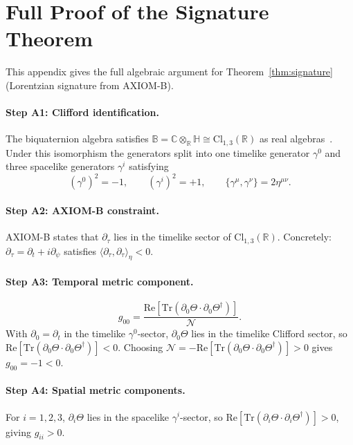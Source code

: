 \documentclass[12pt,a4paper]{article}
\theoremstyle{definition}
\theoremstyle{remark}
\newcommand{\BB}{\mathbb{B}}
\newcommand{\CC}{\mathbb{C}}
\newcommand{\RR}{\mathbb{R}}
\newcommand{\HH}{\mathbb{H}}
\newcommand{\Tr}{\mathrm{Tr}}
\newcommand{\re}{\mathrm{Re}}
\newcommand{\calN}{\mathcal{N}}
\begin{document}
\section{Full Proof of the Signature Theorem}
\label{app:signature}

This appendix gives the full algebraic argument for
Theorem~\ref{thm:signature} (Lorentzian signature from AXIOM-B).

\paragraph{Step A1: Clifford identification.}
The biquaternion algebra satisfies
$\BB = \CC\otimes_\RR\HH \cong \mathrm{Cl}_{1,3}(\RR)$
as real algebras~\cite{porteous1995}.
Under this isomorphism the generators split into one timelike generator
$\gamma^0$ and three spacelike generators $\gamma^i$ satisfying
\[
  (\gamma^0)^2 = -1, \qquad
  (\gamma^i)^2 = +1, \qquad
  \{\gamma^\mu,\gamma^\nu\} = 2\eta^{\mu\nu}.
\]

\paragraph{Step A2: AXIOM-B constraint.}
AXIOM-B states that $\partial_\tau$ lies in the timelike sector of
$\mathrm{Cl}_{1,3}(\RR)$.
Concretely: $\partial_\tau = \partial_t + i\partial_\psi$ satisfies
$\langle\partial_\tau,\partial_\tau\rangle_\eta < 0$.

\paragraph{Step A3: Temporal metric component.}
\[
  g_{00}
  = \frac{\re[\Tr(\partial_0\Theta \cdot \partial_0\Theta^\dagger)]}{\calN}.
\]
With $\partial_0 = \partial_t$ in the timelike $\gamma^0$-sector,
$\partial_0\Theta$ lies in the timelike Clifford sector, so
$\re[\Tr(\partial_0\Theta \cdot \partial_0\Theta^\dagger)] < 0$.
Choosing $\calN = -\re[\Tr(\partial_0\Theta \cdot \partial_0\Theta^\dagger)] > 0$
gives $g_{00} = -1 < 0$.

\paragraph{Step A4: Spatial metric components.}
For $i = 1,2,3$, $\partial_i\Theta$ lies in the spacelike $\gamma^i$-sector,
so $\re[\Tr(\partial_i\Theta \cdot \partial_i\Theta^\dagger)] > 0$,
giving $g_{ii} > 0$.
\end{document}
